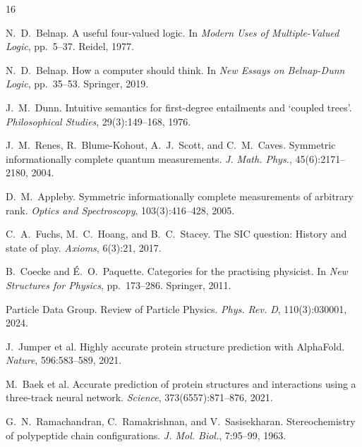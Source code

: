 \documentclass[11pt,a4paper,twocolumn]{article}
\begin{document}
\begin{thebibliography}{16}

N.~D.~Belnap.
\newblock A useful four-valued logic.
\newblock In \emph{Modern Uses of Multiple-Valued Logic}, pp.~5--37. Reidel, 1977.

N.~D.~Belnap.
\newblock How a computer should think.
\newblock In \emph{New Essays on Belnap-Dunn Logic}, pp.~35--53. Springer, 2019.

J.~M.~Dunn.
\newblock Intuitive semantics for first-degree entailments and `coupled trees'.
\newblock \emph{Philosophical Studies}, 29(3):149--168, 1976.

J.~M.~Renes, R.~Blume-Kohout, A.~J.~Scott, and C.~M.~Caves.
\newblock Symmetric informationally complete quantum measurements.
\newblock \emph{J. Math. Phys.}, 45(6):2171--2180, 2004.

D.~M.~Appleby.
\newblock Symmetric informationally complete measurements of arbitrary rank.
\newblock \emph{Optics and Spectroscopy}, 103(3):416--428, 2005.

C.~A.~Fuchs, M.~C.~Hoang, and B.~C.~Stacey.
\newblock The SIC question: History and state of play.
\newblock \emph{Axioms}, 6(3):21, 2017.

B.~Coecke and \'{E}.~O.~Paquette.
\newblock Categories for the practising physicist.
\newblock In \emph{New Structures for Physics}, pp.~173--286. Springer, 2011.

Particle Data Group.
\newblock Review of Particle Physics.
\newblock \emph{Phys. Rev. D}, 110(3):030001, 2024.

J.~Jumper et al.
\newblock Highly accurate protein structure prediction with {AlphaFold}.
\newblock \emph{Nature}, 596:583--589, 2021.

M.~Baek et al.
\newblock Accurate prediction of protein structures and interactions using a three-track neural network.
\newblock \emph{Science}, 373(6557):871--876, 2021.

G.~N.~Ramachandran, C.~Ramakrishnan, and V.~Sasisekharan.
\newblock Stereochemistry of polypeptide chain configurations.
\newblock \emph{J. Mol. Biol.}, 7:95--99, 1963.


\end{thebibliography}
\end{document}
